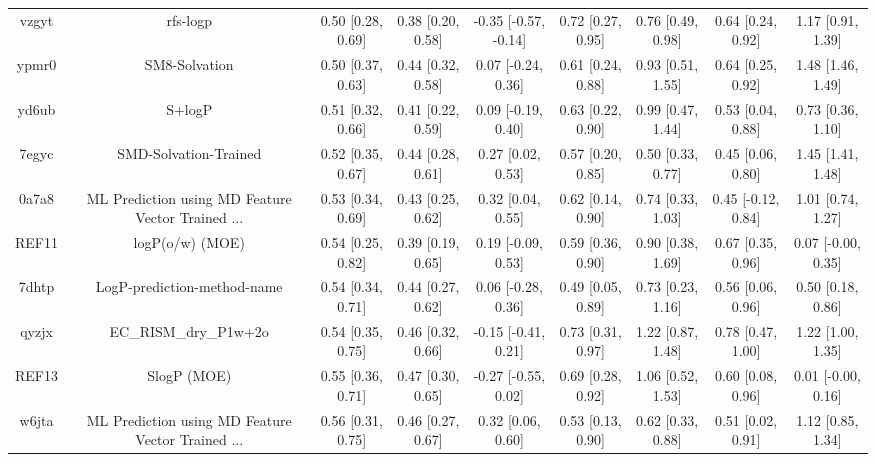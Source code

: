 \documentclass{article}
\begin{document}
\begin{center}
\begin{longtable}{|ccccccccc|}
 vzgyt &                                           rfs-logp &  0.50 [0.28, 0.69] &  0.38 [0.20, 0.58] &  -0.35 [-0.57, -0.14] &  0.72 [0.27, 0.95] &    0.76 [0.49, 0.98] &    0.64 [0.24, 0.92] &     1.17 [0.91, 1.39] \\
 ypmr0 &                                      SM8-Solvation &  0.50 [0.37, 0.63] &  0.44 [0.32, 0.58] &    0.07 [-0.24, 0.36] &  0.61 [0.24, 0.88] &    0.93 [0.51, 1.55] &    0.64 [0.25, 0.92] &     1.48 [1.46, 1.49] \\
 yd6ub &                                             S+logP &  0.51 [0.32, 0.66] &  0.41 [0.22, 0.59] &    0.09 [-0.19, 0.40] &  0.63 [0.22, 0.90] &    0.99 [0.47, 1.44] &    0.53 [0.04, 0.88] &     0.73 [0.36, 1.10] \\
 7egyc &                              SMD-Solvation-Trained &  0.52 [0.35, 0.67] &  0.44 [0.28, 0.61] &     0.27 [0.02, 0.53] &  0.57 [0.20, 0.85] &    0.50 [0.33, 0.77] &    0.45 [0.06, 0.80] &     1.45 [1.41, 1.48] \\
 0a7a8 &  ML Prediction using MD Feature Vector Trained ... &  0.53 [0.34, 0.69] &  0.43 [0.25, 0.62] &     0.32 [0.04, 0.55] &  0.62 [0.14, 0.90] &    0.74 [0.33, 1.03] &   0.45 [-0.12, 0.84] &     1.01 [0.74, 1.27] \\
 REF11 &                                    logP(o/w) (MOE) &  0.54 [0.25, 0.82] &  0.39 [0.19, 0.65] &    0.19 [-0.09, 0.53] &  0.59 [0.36, 0.90] &    0.90 [0.38, 1.69] &    0.67 [0.35, 0.96] &    0.07 [-0.00, 0.35] \\
 7dhtp &                        LogP-prediction-method-name &  0.54 [0.34, 0.71] &  0.44 [0.27, 0.62] &    0.06 [-0.28, 0.36] &  0.49 [0.05, 0.89] &    0.73 [0.23, 1.16] &    0.56 [0.06, 0.96] &     0.50 [0.18, 0.86] \\
 qyzjx &                              EC\_RISM\_dry\_P1w+2o &  0.54 [0.35, 0.75] &  0.46 [0.32, 0.66] &   -0.15 [-0.41, 0.21] &  0.73 [0.31, 0.97] &    1.22 [0.87, 1.48] &    0.78 [0.47, 1.00] &     1.22 [1.00, 1.35] \\
 REF13 &                                        SlogP (MOE) &  0.55 [0.36, 0.71] &  0.47 [0.30, 0.65] &   -0.27 [-0.55, 0.02] &  0.69 [0.28, 0.92] &    1.06 [0.52, 1.53] &    0.60 [0.08, 0.96] &    0.01 [-0.00, 0.16] \\
 w6jta &  ML Prediction using MD Feature Vector Trained ... &  0.56 [0.31, 0.75] &  0.46 [0.27, 0.67] &     0.32 [0.06, 0.60] &  0.53 [0.13, 0.90] &    0.62 [0.33, 0.88] &    0.51 [0.02, 0.91] &     1.12 [0.85, 1.34] \\

\end{longtable}
\end{center}
\end{document}
